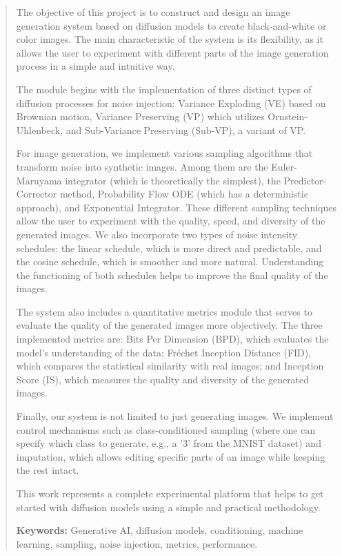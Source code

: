 \documentclass[11pt,a4paper]{article}
\begin{document}

\begin{abstract}
The objective of this project is to construct and design an image generation system based on diffusion models to create black-and-white or color images. The main characteristic of the system is its flexibility, as it allows the user to experiment with different parts of the image generation process in a simple and intuitive way.

The module begins with the implementation of three distinct types of diffusion processes for noise injection: Variance Exploding (VE) based on Brownian motion, Variance Preserving (VP) which utilizes Ornstein-Uhlenbeck, and Sub-Variance Preserving (Sub-VP), a variant of VP.

For image generation, we implement various sampling algorithms that transform noise into synthetic images. Among them are the Euler-Maruyama integrator (which is theoretically the simplest), the Predictor-Corrector method, Probability Flow ODE (which has a deterministic approach), and Exponential Integrator. These different sampling techniques allow the user to experiment with the quality, speed, and diversity of the generated images. We also incorporate two types of noise intensity schedules: the linear schedule, which is more direct and predictable, and the cosine schedule, which is smoother and more natural. Understanding the functioning of both schedules helps to improve the final quality of the images.

The system also includes a quantitative metrics module that serves to evaluate the quality of the generated images more objectively. The three implemented metrics are: Bits Per Dimension (BPD), which evaluates the model's understanding of the data; Fréchet Inception Distance (FID), which compares the statistical similarity with real images; and Inception Score (IS), which measures the quality and diversity of the generated images.

Finally, our system is not limited to just generating images. We implement control mechanisms such as class-conditioned sampling (where one can specify which class to generate, e.g., a '3' from the MNIST dataset) and imputation, which allows editing specific parts of an image while keeping the rest intact.

This work represents a complete experimental platform that helps to get started with diffusion models using a simple and practical methodology.

\textbf{Keywords:} Generative AI, diffusion models, conditioning, machine learning, sampling, noise injection, metrics, performance.
\end{abstract}
\end{document}
